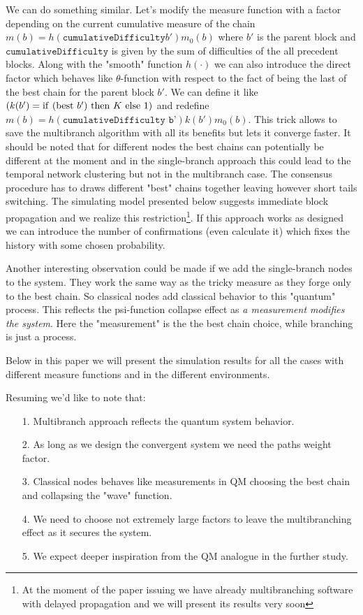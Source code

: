\documentclass[12pt]{article}
\begin{document}
We can do something similar. Let's modify the measure function with a factor depending on the current cumulative measure of the 
chain $m(b)=h(\texttt{cumulativeDifficulty} b') m_0(b)$ where $b'$ is the parent block and $\texttt{cumulativeDifficulty}$
is given by the sum of difficulties of the all precedent blocks. Along with the "smooth" function $h(\cdot)$ we can also introduce the direct 
factor which behaves like $\theta$-function with respect to the fact of being the last of the best chain for the parent block $b'$. We can define 
it like $(k(b') = {\rm if}\ ({\rm best}\ b')\ {\rm then}\ K\ {\rm else}\ 1)$ and redefine $m(b)=h(\texttt{cumulativeDifficulty\ b'}) k(b') m_0(b)$. 
This trick allows to save the multibranch algorithm with all its benefits but lets it converge faster. It should be noted that for different 
nodes the best chains can potentially be different at the moment and in the single-branch approach this could lead to the temporal network clustering 
but not in the multibranch case. The consensus procedure has to draws different "best" chains together leaving however short tails switching.
The simulating model presented below suggests immediate block propagation and we realize this restriction\footnote{At the moment of the paper issuing
we have already multibranching software with delayed propagation and we will present its results very soon}. If this approach works as designed we 
can introduce the number of confirmations (even calculate it) which fixes the history with some chosen probability.

Another interesting observation could be made if we add the single-branch nodes to the system. They work the same way as the tricky measure as they forge
only to the best chain. So classical nodes add classical behavior to this "quantum" process. This reflects the psi-function collapse effect as
{\it a measurement modifies the system}. Here the "measurement" is the the best chain choice, while branching is just a process. 

Below in this paper we will present the simulation results for all the cases with different measure functions and in the different environments.

Resuming we'd like to note that:
\begin{itemize}
\item[1.] {Multibranch approach reflects the quantum system behavior.}
\item[2.] {As long as we design the convergent system we need the paths weight factor.}
\item[3.] {Classical nodes behaves like measurements in QM choosing the best chain and collapsing the "wave" function.}
\item[4.] {We need to choose not extremely large factors to leave the multibranching effect as it secures the system.} 
\item[5.] {We expect deeper inspiration from the QM analogue in the further study.}
\end{itemize}
\end{document}
